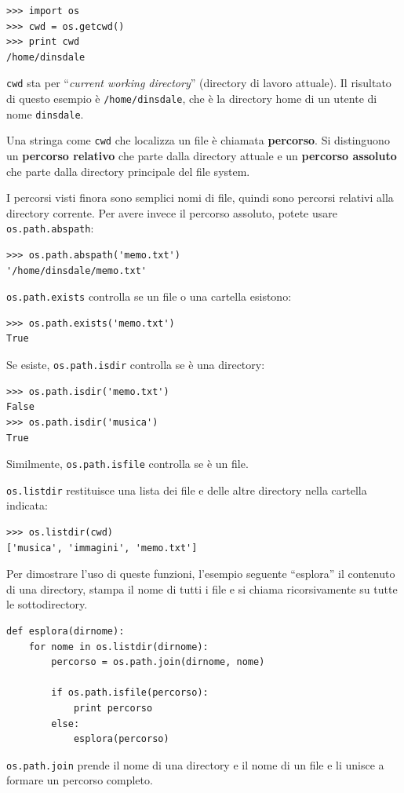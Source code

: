 \documentclass[10pt]{book}
\begin{document}
\begin{verbatim}
>>> import os
>>> cwd = os.getcwd()
>>> print cwd
/home/dinsdale
\end{verbatim}
%
{\tt cwd} sta per ``{\em current working directory}'' (directory di lavoro attuale). 
Il risultato di questo esempio è {\tt /home/dinsdale}, che è la directory home di un utente di nome {\tt dinsdale}.

Una stringa come {\tt cwd} che localizza un file è chiamata {\bf percorso}.
Si distinguono un {\bf percorso relativo} che parte dalla directory attuale e un {\bf percorso assoluto} che parte dalla directory principale del file system.

I percorsi visti finora sono semplici nomi di file, quindi sono percorsi relativi alla directory corrente. Per avere invece il percorso assoluto, potete usare {\tt os.path.abspath}:

\begin{verbatim}
>>> os.path.abspath('memo.txt')
'/home/dinsdale/memo.txt'
\end{verbatim}
%
{\tt os.path.exists} controlla se un file o una cartella esistono:

\begin{verbatim}
>>> os.path.exists('memo.txt')
True
\end{verbatim}
%
Se esiste, {\tt os.path.isdir} controlla se è una directory:

\begin{verbatim}
>>> os.path.isdir('memo.txt')
False
>>> os.path.isdir('musica')
True
\end{verbatim}
%
Similmente, {\tt os.path.isfile} controlla se è un file.

{\tt os.listdir} restituisce una lista dei file e delle altre directory nella cartella indicata:

\begin{verbatim}
>>> os.listdir(cwd)
['musica', 'immagini', 'memo.txt']
\end{verbatim}
%
Per dimostrare l'uso di queste funzioni, l'esempio seguente
``esplora'' il contenuto di una directory, stampa il nome di tutti i file e si chiama ricorsivamente su tutte le sottodirectory.

\begin{verbatim}
def esplora(dirnome):
    for nome in os.listdir(dirnome):
        percorso = os.path.join(dirnome, nome)

        if os.path.isfile(percorso):
            print percorso
        else:
            esplora(percorso)
\end{verbatim}
%
{\tt os.path.join} prende il nome di una directory e il nome di un file e li unisce a formare un percorso completo.  
\end{document}
